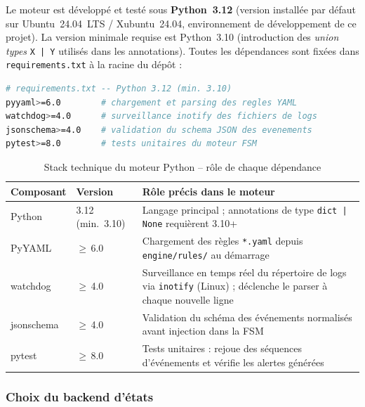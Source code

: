 \documentclass[11pt,a4paper]{article}
\begin{document}
Le moteur est développé et testé sous \textbf{Python~3.12}
(version installée par défaut sur Ubuntu~24.04~LTS / Xubuntu~24.04,
environnement de développement de ce projet).
La version minimale requise est Python~3.10 (introduction des
\emph{union types} \texttt{X | Y} utilisés dans les annotations).
Toutes les dépendances sont fixées dans \texttt{requirements.txt}
à la racine du dépôt :

\begin{lstlisting}[language=bash, caption={requirements.txt -- dépendances exactes du moteur}]
# requirements.txt -- Python 3.12 (min. 3.10)
pyyaml>=6.0        # chargement et parsing des regles YAML
watchdog>=4.0      # surveillance inotify des fichiers de logs
jsonschema>=4.0    # validation du schema JSON des evenements
pytest>=8.0        # tests unitaires du moteur FSM
\end{lstlisting}

\begin{table}[H]
\centering
\caption{Stack technique du moteur Python -- rôle de chaque dépendance}
\small
\begin{tabularx}{\textwidth}{L{2.5cm} C{2.2cm} L{7.3cm}}
\toprule
{}
{\color{white}\textbf{Composant}} &
{\color{white}\textbf{Version}} &
{\color{white}\textbf{Rôle précis dans le moteur}} \\
\midrule
Python & 3.12 (min.\ 3.10) & Langage principal ; annotations de type \texttt{dict | None} requièrent 3.10+ \\
PyYAML & $\geq$\,6.0 & Chargement des règles \texttt{*.yaml} depuis \texttt{engine/rules/} au démarrage \\
watchdog & $\geq$\,4.0 & Surveillance en temps réel du répertoire de logs via \texttt{inotify} (Linux) ; déclenche le parser à chaque nouvelle ligne \\
jsonschema & $\geq$\,4.0 & Validation du schéma des événements normalisés avant injection dans la FSM \\
pytest & $\geq$\,8.0 & Tests unitaires : rejoue des séquences d'événements et vérifie les alertes générées \\
\bottomrule
\end{tabularx}
\end{table}

\subsubsection{Choix du backend d'états}
\end{document}
